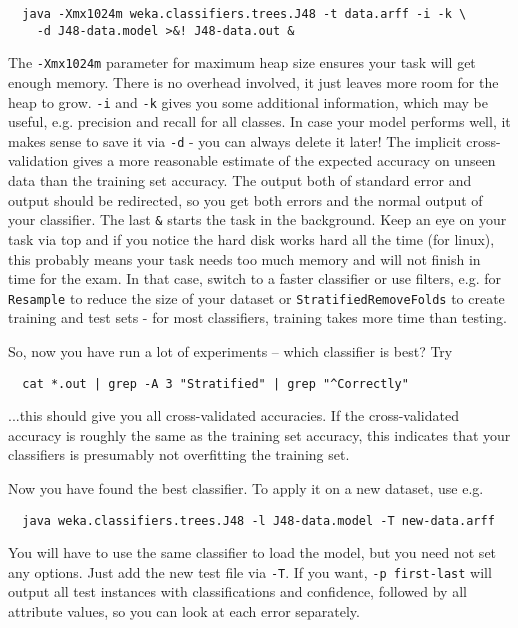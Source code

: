 {\scriptsize
\begin{verbatim}
  java -Xmx1024m weka.classifiers.trees.J48 -t data.arff -i -k \
    -d J48-data.model >&! J48-data.out &
\end{verbatim}}

The \texttt{-Xmx1024m} parameter for maximum heap size ensures your task will get enough memory. There is no overhead involved, it just leaves more room for the heap to grow. \texttt{-i} and \texttt{-k} gives you some additional information, which may be useful, e.g. precision and recall for all classes. In case your model performs well, it makes sense to save it via \texttt{-d} - you can always delete it later! The implicit cross-validation gives a more reasonable estimate of the expected accuracy on unseen data than the training set accuracy. The output both of standard error and output should be redirected, so you get both errors and the normal output of your classifier. The last \texttt{\&} starts the task in the background. Keep an eye on your task via top and if you notice the hard disk works hard all the time (for linux), this probably means your task needs too much memory and will not finish in time for the exam. In that case, switch to a faster classifier or use filters, e.g. for \texttt{Resample} to reduce the size of your dataset or \texttt{StratifiedRemoveFolds} to create training and test sets - for most classifiers, training takes more time than testing.

So, now you have run a lot of experiments -- which classifier is best? Try

{\scriptsize
\begin{verbatim}
  cat *.out | grep -A 3 "Stratified" | grep "^Correctly"
\end{verbatim}}

\noindent ...this should give you all cross-validated accuracies. If the cross-validated accuracy is roughly the same as the training set accuracy, this indicates that your classifiers is presumably not overfitting the training set.

Now you have found the best classifier. To apply it on a new dataset, use e.g.

{\scriptsize
\begin{verbatim}
  java weka.classifiers.trees.J48 -l J48-data.model -T new-data.arff
\end{verbatim}}

\noindent You will have to use the same classifier to load the model, but you need not set any options. Just add the new test file via \texttt{-T}. If you want, \texttt{-p first-last} will output all test instances with classifications and confidence, followed by all attribute values, so you can look at each error separately.

